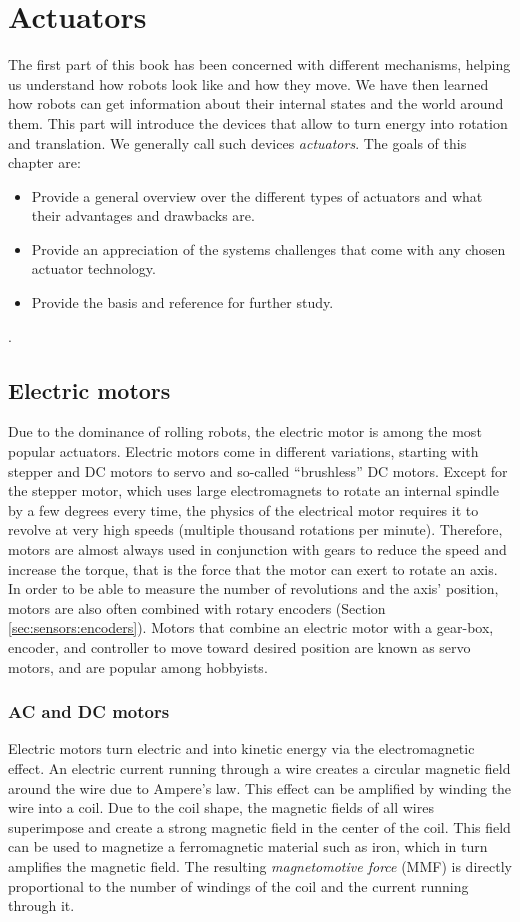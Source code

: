 \chapter{Actuators}
The first part of this book has been concerned with different mechanisms, helping us understand how robots look like and how they move. We have then learned how robots can get information about their internal states and the world around them. This part will introduce the devices that allow to turn energy into rotation and translation. We generally call such devices \emph{actuators}. The goals of this chapter are:

\begin{itemize}
\item Provide a general overview over the different types of actuators and what their advantages and drawbacks are.
\item Provide an appreciation of the systems challenges that come with any chosen actuator technology.
\item Provide the basis and reference for further study.
\end{itemize}. 

\section{Electric motors}
Due to the dominance of rolling robots, the electric motor \cite{hughes2019electric} is among the most popular actuators. Electric motors come in different variations, starting with stepper and DC motors to servo and so-called ``brushless'' DC motors. Except for the stepper motor, which uses large electromagnets to rotate an internal spindle by a few degrees every time, the physics of the electrical motor requires it to revolve at very high speeds (multiple thousand rotations per minute). Therefore, motors are almost always used in conjunction with gears to reduce the speed and increase the torque, that is the force that the motor can exert to rotate an axis. In order to be able to measure the number of revolutions and the axis' position, motors are also often combined with rotary encoders (Section \ref{sec:sensors:encoders}). Motors that combine an electric motor with a gear-box, encoder, and controller to move toward desired position are known as servo motors, and are popular among hobbyists.

\subsection{AC and DC motors}
Electric motors turn electric and into kinetic energy via the electromagnetic effect. An electric current running through a wire creates a circular magnetic field around the wire due to Ampere's law. This effect can be amplified by winding the wire into a coil. Due to the coil shape, the magnetic fields of all wires superimpose and create a strong magnetic field in the center of the coil. This field can be used to magnetize a ferromagnetic material such as iron, which in turn amplifies the magnetic field. The resulting \emph{magnetomotive force} (MMF) is directly proportional to the number of windings of the coil and the current running through it. 

